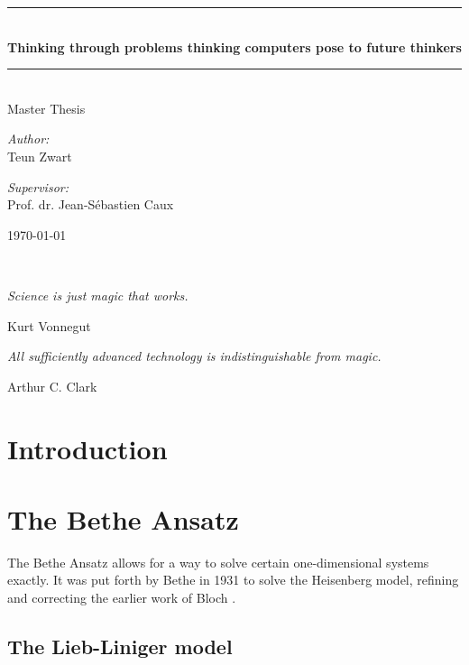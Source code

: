 \documentclass[11pt, a4paper]{report} %
\newcommand\TITLE{Thinking through problems thinking computers pose to future thinkers}
\newcommand\THESISFORM{Master Thesis}
\newcommand\AUTHOR{Teun Zwart}
\newcommand\SUPERVISOR{Prof. dr. Jean-Sébastien Caux}
\newcommand\UNIVERSITYLOGO{} %
\begin{document}
\begin{titlepage}
	\begin{center}
		\rule{\textwidth}{0.4mm}\\[0.5cm]
		\huge{\textbf{\TITLE}}
		\rule{\textwidth}{0.4mm}\\[0.5cm]
		\Large{\THESISFORM}\\[0.5cm]
		\begin{minipage}[t]{0.4\textwidth}
			\begin{flushleft}
				\large\emph{Author:}\\{\AUTHOR}
			\end{flushleft}
		\end{minipage}
		\begin{minipage}[t]{0.4\textwidth}
			\begin{flushright}
				\large\emph{Supervisor:}\\{\SUPERVISOR}
			\end{flushright}
		\end{minipage}
		\vfill
		\large \today\\
	\end{center}
\end{titlepage}

\newpage
\thispagestyle{empty}

\ 
\vspace{4cm}

\epigraph{\itshape Science is just magic that works.}{Kurt Vonnegut}

\epigraph{\itshape All sufficiently advanced technology is indistinguishable from magic.}{Arthur C. Clark}


\tableofcontents

\chapter{Introduction}

\chapter{The Bethe Ansatz}

The Bethe Ansatz allows for a way to solve certain one-dimensional systems exactly.
It was put forth by Bethe in 1931 to solve the Heisenberg model, refining and correcting the earlier work of Bloch \cite{Bethe1931}.

\section{The Lieb-Liniger model}
\end{document}
